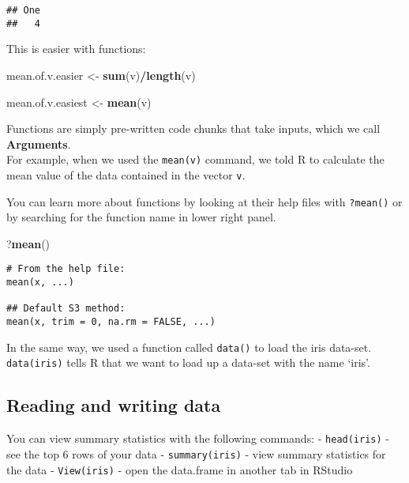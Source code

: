 \documentclass[]{article}
\newenvironment{Shaded}{\begin{snugshade}}{\end{snugshade}}
\newcommand{\KeywordTok}[1]{\textcolor[rgb]{0.13,0.29,0.53}{\textbf{#1}}}
\newcommand{\StringTok}[1]{\textcolor[rgb]{0.31,0.60,0.02}{#1}}
\newcommand{\OperatorTok}[1]{\textcolor[rgb]{0.81,0.36,0.00}{\textbf{#1}}}
\newcommand{\NormalTok}[1]{#1}
\begin{document}
\begin{verbatim}
## One 
##   4
\end{verbatim}

This is easier with functions:

\begin{Shaded}
\begin{Highlighting}[]
\NormalTok{mean.of.v.easier <-}\StringTok{ }\KeywordTok{sum}\NormalTok{(v)}\OperatorTok{/}\KeywordTok{length}\NormalTok{(v)}

\NormalTok{mean.of.v.easiest <-}\StringTok{ }\KeywordTok{mean}\NormalTok{(v)}
\end{Highlighting}
\end{Shaded}

Functions are simply pre-written code chunks that take inputs, which we
call \textbf{Arguments}.\\
For example, when we used the \texttt{mean(v)} command, we told R to
calculate the mean value of the data contained in the vector \texttt{v}.

You can learn more about functions by looking at their help files with
\texttt{?mean()} or by searching for the function name in lower right
panel.

\begin{Shaded}
\begin{Highlighting}[]
\NormalTok{?}\KeywordTok{mean}\NormalTok{()}
\end{Highlighting}
\end{Shaded}

\begin{verbatim}
# From the help file:
mean(x, ...)

## Default S3 method:
mean(x, trim = 0, na.rm = FALSE, ...)
\end{verbatim}

In the same way, we used a function called \texttt{data()} to load the
iris data-set. \texttt{data(\textquotesingle{}iris\textquotesingle{})}
tells R that we want to load up a data-set with the name `iris'.

\subsection{Reading and writing data}\label{reading-and-writing-data}

You can view summary statistics with the following commands: -
\texttt{head(iris)} - see the top 6 rows of your data -
\texttt{summary(iris)} - view summary statistics for the data -
\texttt{View(iris)} - open the data.frame in another tab in RStudio
\end{document}
